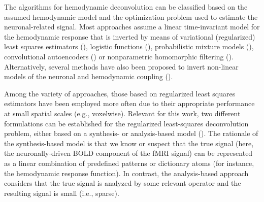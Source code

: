 The algorithms for hemodynamic deconvolution can be classified based on the assumed hemodynamic model and the optimization problem used to estimate the neuronal-related signal. Most approaches assume a linear time-invariant model for the hemodynamic response that is inverted by means of variational (regularized) least squares estimators (\citealt{Glover1999DeconvolutionImpulseResponse,Gitelman2003Modelingregionalpsychophysiologic,Gaudes2010Detectioncharacterizationsingle,Gaudes2012Structuredsparsedeconvolution,Gaudes2013Paradigmfreemapping,CaballeroGaudes2019deconvolutionalgorithmmulti,HernandezGarcia2011Neuronaleventdetection,Karahanoglu2013TotalactivationfMRI,Cherkaoui2019SparsitybasedBlind,Costantini2021ParadigmFreeRegularization,Huetel2021Hemodynamicmatrixfactorization}), logistic functions (\citealt{Bush2013Decodingneuralevents,Bush2015deconvolutionbasedapproach,Loula2018DecodingfMRIactivity}), probabilistic mixture models (\citealt{Pidnebesna2019EstimatingSparseNeuronal}), convolutional autoencoders (\citealt{Huetel2018NeuralActivationEstimation}) or nonparametric homomorphic filtering (\citealt{Sreenivasan2015NonparametricHemodynamicDeconvolution}). Alternatively, several methods have also been proposed to invert non-linear models of the neuronal and hemodynamic coupling (\citealt{Riera2004statespacemodel,Friston2008DEMvariationaltreatment,Havlicek2011Dynamicmodelingneuronal,Aslan2016Jointstateparameter,Madi2017HybridCubatureKalman,ruizeuler2018nonlinear}). 

Among the variety of approaches, those based on regularized least squares estimators have been employed more often due to their appropriate performance at small spatial scales (e.g., voxelwise). Relevant for this work, two different formulations can be established for the regularized least-squares deconvolution problem, either based on a synthesis- or analysis-based model (\citealt{Elad2007Analysisversussynthesis,ortelli2019synthesis}). The rationale of the synthesis-based model is that we know or suspect that the true signal (here, the neuronally-driven BOLD component of the fMRI signal) can be represented as a linear combination of predefined patterns or dictionary atoms (for instance, the hemodynamic response function). In contrast, the analysis-based approach considers that the true signal is analyzed by some relevant operator and the resulting signal is small (i.e., sparse).

